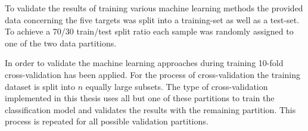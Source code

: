 \label{cha:data_partitioning}
To validate the results of training various machine learning methods the provided data concerning
the five targets was split into a training-set as well as a test-set. To achieve a 70/30 train/test split ratio each sample was randomly assigned 
to one of the two data partitions\cite[]{Xu2018}.

In order to validate the machine learning approaches during training 10-fold cross-validation has been applied.
For the process of cross-validation the training dataset is split into $n$ equally large subsets.
The type of cross-validation implemented in this thesis uses all but one of these partitions to train the classification model and validates the 
results with the remaining partition. This process is repeated for all possible validation partitions\cite[]{Molinaro2005}.